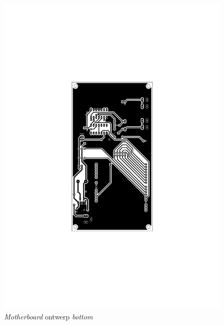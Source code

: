 \begin{figure}
    \includegraphics[scale=0.75]{figures/motherboard_bottom.pdf}
    \caption{\emph{Motherboard} ontwerp \emph{bottom}}
\end{figure}
